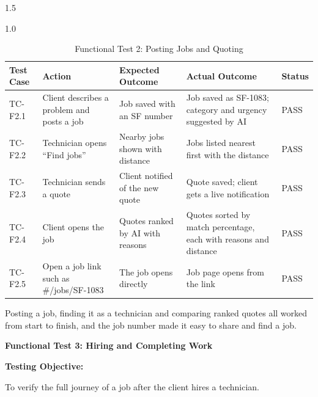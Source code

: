 \documentclass[A4paper,12pt]{report}
\theoremstyle{plain}
\theoremstyle{definition}
\theoremstyle{remark}
\numberwithin{equation}{section}
\begin{document}
\begin{spacing}{1.5}
\begin{table}[H]
\centering
\caption{Functional Test 2: Posting Jobs and Quoting}
\begin{spacing}{1.0}
{\small
\begin{tabular}{|p{}|p{}|p{}|p{}|p{}|}
\hline
\textbf{Test Case} & \textbf{Action} & \textbf{Expected Outcome} & \textbf{Actual Outcome} & \textbf{Status} \\ \hline
TC-F2.1 & Client describes a problem and posts a job & Job saved with an SF number & Job saved as SF-1083; category and urgency suggested by AI & PASS \\ \hline
TC-F2.2 & Technician opens ``Find jobs'' & Nearby jobs shown with distance & Jobs listed nearest first with the distance & PASS \\ \hline
TC-F2.3 & Technician sends a quote & Client notified of the new quote & Quote saved; client gets a live notification & PASS \\ \hline
TC-F2.4 & Client opens the job & Quotes ranked by AI with reasons & Quotes sorted by match percentage, each with reasons and distance & PASS \\ \hline
TC-F2.5 & Open a job link such as \#/jobs/SF-1083 & The job opens directly & Job page opens from the link & PASS \\ \hline
\end{tabular}}
\end{spacing}
\end{table}

Posting a job, finding it as a technician and comparing ranked quotes all worked from start to finish, and the job number made it easy to share and find a job.

\textbf{Functional Test 3: Hiring and Completing Work}

\textbf{Testing Objective:}

To verify the full journey of a job after the client hires a technician.


\end{spacing}
\end{document}
